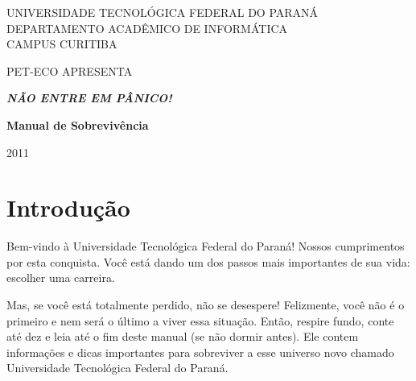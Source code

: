 \documentclass[a4paper,12pt,openany]{article}
\newcommand\BackgroundPic{
\put(0,0){
\parbox[b][\paperheight]{\paperwidth}{
\vfill
\centering
\vfill
}}}
\begin{document}
	\begin{titlepage}
	

        \begin{center}
            UNIVERSIDADE TECNOLÓGICA FEDERAL DO PARANÁ\\
            DEPARTAMENTO ACADÊMICO DE INFORMÁTICA\\
            CAMPUS CURITIBA

            \vspace{4cm}

            PET-ECO APRESENTA

            \vfill

	        { \Huge \emph { \textbf {NÃO ENTRE EM PÂNICO! }} }


            \vspace{4cm}

	        { \LARGE \textbf {Manual de Sobrevivência} }

            \vfill

            2011
        \end{center}

	\end{titlepage}

\thispagestyle{empty}
\tableofcontents

\newpage
\section{Introdução}

Bem-vindo à Universidade Tecnológica Federal do Paraná! Nossos cumprimentos por esta conquista. Você está dando um dos passos mais importantes de sua vida: escolher uma carreira.

Mas, se você está totalmente perdido, não se desespere! Felizmente, você não é o primeiro e nem será o último a viver essa situação. Então, respire fundo, conte até dez e leia até o fim deste manual (se não dormir antes). Ele contem informações e dicas importantes para sobreviver a esse universo novo chamado Universidade Tecnológica Federal do Paraná.  
\end{document}
